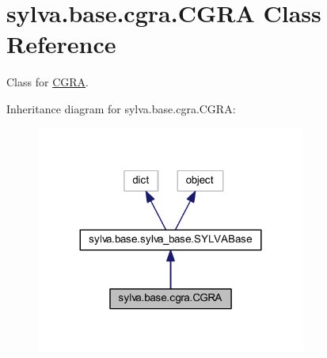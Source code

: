 \hypertarget{classsylva_1_1base_1_1cgra_1_1_c_g_r_a}{}\section{sylva.\+base.\+cgra.\+C\+G\+RA Class Reference}
\label{classsylva_1_1base_1_1cgra_1_1_c_g_r_a}


Class for \hyperlink{classsylva_1_1base_1_1cgra_1_1_c_g_r_a}{C\+G\+RA}.  




Inheritance diagram for sylva.\+base.\+cgra.\+C\+G\+RA\+:\nopagebreak
\begin{figure}[H]
\begin{center}
\leavevmode
\includegraphics[width=251pt]{classsylva_1_1base_1_1cgra_1_1_c_g_r_a__inherit__graph}
\end{center}
\end{figure}
